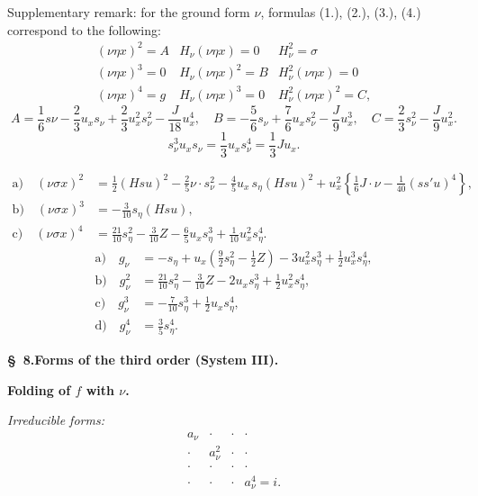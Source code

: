 \documentclass[11pt]{article}
\begin{document}
Supplementary remark: for the ground form $\nu$, formulas (1.), (2.), (3.), (4.) correspond to the following:
\[
\tag{5}
\begin{array}{c|c|c}
(\nu\eta x)^2=A & H_\nu(\nu\eta x)=0 & H_\nu^2=\sigma\\[0.4em]
(\nu\eta x)^3=0 & H_\nu(\nu\eta x)^2=B & H_\nu^2(\nu\eta x)=0\\[0.4em]
(\nu\eta x)^4=g & H_\nu(\nu\eta x)^3=0 & H_\nu^2(\nu\eta x)^2=C,
\end{array}
\]
\[
A=\frac16s\nu-\frac23u_xs_\nu+\frac23u_x^2s_\nu^2-\frac{J}{18}u_x^4,
\quad B=-\frac56s_\nu+\frac76u_xs_\nu^2-\frac{J}{9}u_x^3,
\quad C=\frac23s_\nu^2-\frac{J}{9}u_x^2.
\]
\[
\tag{6}
s_\nu^3u_xs_\nu=\frac13u_xs_\nu^4=\frac13Ju_x.
\]


\[
\tag{7}
\begin{aligned}
\text{a)}\quad (\nu\sigma x)^2
&=\frac12(Hsu)^2-\frac25\nu\cdot s_\nu^2-
\frac45u_x\,s_\eta(Hsu)^2
+u_x^2\left\{\frac16J\cdot\nu-\frac1{40}(ss'u)^4\right\},\\
\text{b)}\quad (\nu\sigma x)^3&=-\frac3{10}s_\eta(Hsu),\\
\text{c)}\quad (\nu\sigma x)^4&=\frac{21}{10}s_\eta^2-\frac3{10}Z-
\frac65u_xs_\eta^3+\frac1{10}u_x^2s_\eta^4.
\end{aligned}
\]
\[
\tag{8}
\begin{aligned}
\text{a)}\quad g_\nu&=-s_\eta+u_x\left(\frac92s_\eta^2-\frac12Z\right)-3u_x^2s_\eta^3+\frac12u_x^3s_\eta^4,\\
\text{b)}\quad g_\nu^2&=\frac{21}{10}s_\eta^2-\frac3{10}Z-2u_xs_\eta^3+\frac12u_x^2s_\eta^4,\\
\text{c)}\quad g_\nu^3&=-\frac7{10}s_\eta^3+\frac12u_xs_\eta^4,\\
\text{d)}\quad g_\nu^4&=\frac35s_\eta^4.
\end{aligned}
\]

\begin{center}
\textbf{\S\ 8.\quad Forms of the third order (System III).}
\end{center}

\noindent\textbf{Folding of $f$ with $\nu$.}

\noindent\emph{Irreducible forms:}
\[
\begin{array}{cccc}
a_\nu&\cdot&\cdot&\cdot\\
\cdot&a_\nu^2&\cdot&\cdot\\
\cdot&\cdot&\cdot&\cdot\\
\cdot&\cdot&\cdot&a_\nu^4=i.
\end{array}
\]
\end{document}
